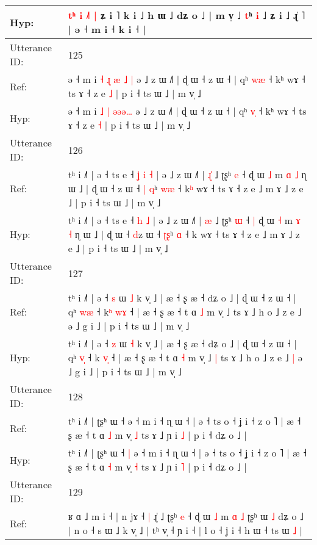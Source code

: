 \documentclass[10pt]{article}
\DeclareRobustCommand{\hl}[1]{{\textcolor{red}{#1}}}
\begin{document}
\begin{longtable}{ll}
Hyp: & \hl{t}\hl{ʰ}\hl{ }\hl{i} \hl{˩}\hl{˥} \hl{|} ʑ i ˥ k i ˩ h ɯ ˩ dʑ o ˩ | m v̩ ˩ \hl{}\hl{t}ʰ \hl{i} ˩ ʑ i ˩ ɻ̍ ˥ | ə ˧ m i ˧ k i ˧ |
 \\
\midrule
Utterance ID: & 125 \\
Ref: & ə ˧ m i \hl{˧} \hl{ɻ} \hl{æ}\hl{ }\hl{˩}\hl{ }\hl{|} ə ˩ z ɯ ˩˥ | ɖ ɯ ˧ z ɯ ˧ | qʰ \hl{w}\hl{æ} ˧ kʰ wɤ ˧ ts ɤ ˧ z e \hl{˩} | p i ˧ ts ɯ ˩ | m v̩ ˩
 \\
Hyp: & ə ˧ m i \hl{˩} \hl{|} \hl{}\hl{ə}\hl{ə}\hl{ə}\hl{…} ə ˩ z ɯ ˩˥ | ɖ ɯ ˧ z ɯ ˧ | qʰ \hl{v}\hl{̩} ˧ kʰ wɤ ˧ ts ɤ ˧ z e \hl{˧} | p i ˧ ts ɯ ˩ | m v̩ ˩
 \\
\midrule
Utterance ID: & 126 \\
Ref: & tʰ i ˩˥ | ə ˧ ts e ˧\hl{ }\hl{ʝ} \hl{i} \hl{˧} | ə ˩ z ɯ ˩˥ | \hl{ɻ}\hl{̍} ˩ ʈʂʰ \hl{e} ˧\hl{}\hl{} ɖ ɯ \hl{˩} m \hl{ɑ} \hl{˩} ɳ ɯ ˩ | ɖ ɯ ˧ \hl{}z ɯ ˧ \hl{|}\hl{ }\hl{q}ʰ \hl{w}\hl{æ} ˧ k\hl{ʰ} wɤ ˧ ts ɤ ˧ z e ˩ m ɤ ˩ z e ˩ | p i ˧ ts ɯ ˩ | m v̩ ˩
 \\
Hyp: & tʰ i ˩˥ | ə ˧ ts e ˧\hl{}\hl{} \hl{h} \hl{˩} | ə ˩ z ɯ ˩˥ | \hl{}\hl{æ} ˩ ʈʂʰ \hl{ɯ} ˧\hl{ }\hl{|} ɖ ɯ \hl{˧} m \hl{ɤ} \hl{˧} ɳ ɯ ˩ | ɖ ɯ ˧ \hl{d}z ɯ ˧ \hl{}\hl{ʈ}\hl{ʂ}ʰ \hl{}\hl{ɑ} ˧ k\hl{} wɤ ˧ ts ɤ ˧ z e ˩ m ɤ ˩ z e ˩ | p i ˧ ts ɯ ˩ | m v̩ ˩
 \\
\midrule
Utterance ID: & 127 \\
Ref: & tʰ i ˩˥ | ə ˧ \hl{s} ɯ \hl{˩} k v̩ ˩ | æ ˧ ʂ æ ˧ dʑ o ˩ | ɖ ɯ ˧ z ɯ ˧ | qʰ \hl{w}\hl{æ} ˧ k\hl{ʰ} \hl{w}\hl{ɤ} ˧ | æ ˧ ʂ æ ˧ t ɑ \hl{˩} m v̩ ˩\hl{}\hl{} ts ɤ ˩ h o ˩ z e ˩\hl{}\hl{} ə ˩ g i ˩ | p i ˧ ts ɯ ˩ | m v̩ ˩
 \\
Hyp: & tʰ i ˩˥ | ə ˧ \hl{z} ɯ \hl{˧} k v̩ ˩ | æ ˧ ʂ æ ˧ dʑ o ˩ | ɖ ɯ ˧ z ɯ ˧ | qʰ \hl{v}\hl{̩} ˧ k\hl{} \hl{v}\hl{̩} ˧ | æ ˧ ʂ æ ˧ t ɑ \hl{˧} m v̩ ˩\hl{ }\hl{|} ts ɤ ˩ h o ˩ z e ˩\hl{ }\hl{|} ə ˩ g i ˩ | p i ˧ ts ɯ ˩ | m v̩ ˩
 \\
\midrule
Utterance ID: & 128 \\
Ref: & tʰ i ˩˥ | ʈʂʰ ɯ ˧\hl{}\hl{} ə ˧ m i ˧ ɳ ɯ ˧ | ə ˧ ts o ˧ ʝ i ˧ z o ˥ | æ ˧ ʂ æ ˧ t ɑ \hl{˩} m v̩ \hl{˩} ts ɤ ˩ ɲ i \hl{˩} | p i ˧ dʑ o ˩ |
 \\
Hyp: & tʰ i ˩˥ | ʈʂʰ ɯ ˧\hl{ }\hl{|} ə ˧ m i ˧ ɳ ɯ ˧ | ə ˧ ts o ˧ ʝ i ˧ z o ˥ | æ ˧ ʂ æ ˧ t ɑ \hl{˧} m v̩ \hl{˧} ts ɤ ˩ ɲ i \hl{˥} | p i ˧ dʑ o ˩ |
 \\
\midrule
Utterance ID: & 129 \\
Ref: & ʁ ɑ ˩ m i ˧ | n jɤ ˧\hl{ }\hl{|} ɻ̍ ˩ ʈʂʰ \hl{e} ˧\hl{}\hl{} ɖ ɯ \hl{˩} m \hl{ɑ} \hl{˩} ʈʂʰ ɯ \hl{˩} dʑ o ˩ | n o ˧ s ɯ ˩ k v̩ ˩ | tʰ v̩ ˧ ɲ i ˧\hl{}\hl{}\hl{}\hl{}\hl{}\hl{}\hl{} | l o ˧ ʝ i ˧ h ɯ ˧ ts ɯ\hl{ }\hl{˩} |

\end{longtable}
\end{document}
